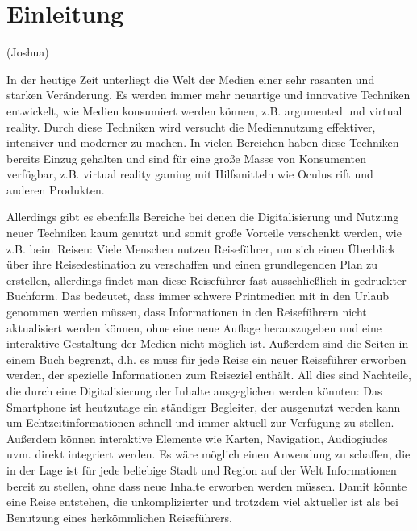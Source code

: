 \chapter{Einleitung}

	(Joshua)

	In der heutige Zeit unterliegt die Welt der Medien einer sehr rasanten und starken Veränderung. Es werden immer mehr neuartige und innovative Techniken entwickelt, wie Medien konsumiert werden können, z.B. argumented und virtual reality. Durch diese Techniken wird versucht die Mediennutzung effektiver, intensiver und moderner zu machen. In vielen Bereichen haben diese Techniken bereits Einzug gehalten und sind für eine große Masse von Konsumenten verfügbar, z.B. virtual reality gaming mit Hilfsmitteln wie Oculus rift und anderen Produkten.

	\vspace{0.25cm}

	Allerdings gibt es ebenfalls Bereiche bei denen die Digitalisierung und Nutzung neuer Techniken kaum genutzt und somit große Vorteile verschenkt werden, wie z.B. beim Reisen: Viele Menschen nutzen Reiseführer, um sich einen Überblick über ihre Reisedestination zu verschaffen und einen grundlegenden Plan zu erstellen, allerdings findet man diese Reiseführer fast ausschließlich in gedruckter Buchform. Das bedeutet, dass immer schwere Printmedien mit in den Urlaub genommen werden müssen, dass Informationen in den Reiseführern nicht aktualisiert werden können, ohne eine neue Auflage herauszugeben und eine interaktive Gestaltung der Medien nicht möglich ist. Außerdem sind die Seiten in einem Buch begrenzt, d.h. es muss für jede Reise ein neuer Reiseführer erworben werden, der spezielle Informationen zum Reiseziel enthält. All dies sind Nachteile, die durch eine Digitalisierung der Inhalte ausgeglichen werden könnten: Das Smartphone ist heutzutage ein ständiger Begleiter, der ausgenutzt werden kann um Echtzeitinformationen schnell und immer aktuell zur Verfügung zu stellen. Außerdem können interaktive Elemente wie Karten, Navigation, Audiogiudes uvm. direkt integriert werden. Es wäre möglich einen Anwendung zu schaffen, die in der Lage ist für jede beliebige Stadt und Region auf der Welt Informationen bereit zu stellen, ohne dass neue Inhalte erworben werden müssen. Damit könnte eine Reise entstehen, die unkomplizierter und trotzdem viel aktueller ist als bei Benutzung eines herkömmlichen Reiseführers.

	\vspace{0.25cm}

